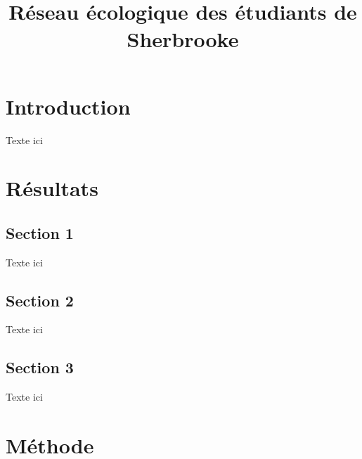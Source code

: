 \documentclass[9pt,twocolumn,twoside,]{pnas-new}
\title{Réseau écologique des étudiants de Sherbrooke}
\author[]{}
\author[]{}
\author[]{}
\author[]{}
\begin{document}
\verticaladjustment{-2pt}



\maketitle
\thispagestyle{firststyle}


\acknow{}

\hypertarget{introduction}{%
\section{Introduction}\label{introduction}}

Texte ici

\hypertarget{ruxe9sultats}{%
\section{Résultats}\label{ruxe9sultats}}

\hypertarget{section-1}{%
\subsection{Section 1}\label{section-1}}

Texte ici

\hypertarget{section-2}{%
\subsection{Section 2}\label{section-2}}

Texte ici

\hypertarget{section-3}{%
\subsection{Section 3}\label{section-3}}

Texte ici

\hypertarget{muxe9thode}{%
\section{Méthode}\label{muxe9thode}}
\end{document}

